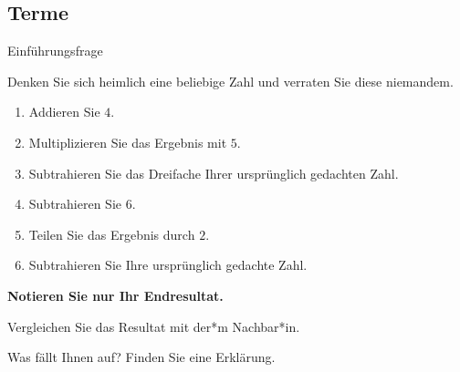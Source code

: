 \subsection{Terme}
\begin{LA}
    {Einführungsfrage}{}

    Denken Sie sich heimlich eine beliebige Zahl und verraten Sie diese niemandem.

    \begin{enumerate}
        \item Addieren Sie \(4\).
        \item Multiplizieren Sie das Ergebnis mit \(5\).
        \item Subtrahieren Sie das Dreifache Ihrer ursprünglich gedachten Zahl.
        \item Subtrahieren Sie \(6\).
        \item Teilen Sie das Ergebnis durch \(2\).
        \item Subtrahieren Sie Ihre ursprünglich gedachte Zahl.
    \end{enumerate}

    \textbf{Notieren Sie nur Ihr Endresultat.}

    Vergleichen Sie das Resultat mit der*m Nachbar*in.

    Was fällt Ihnen auf? Finden Sie eine Erklärung.
\end{LA}

